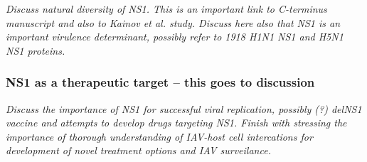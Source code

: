 		\textit{Discuss natural diversity of NS1. This is an important link to C-terminus manuscript and also to Kainov et al. study. Discuss here also that NS1 is an important virulence determinant, possibly refer to 1918 H1N1 NS1 and H5N1 NS1 proteins.}
		
		\subsubsection{NS1 as a therapeutic target -- this goes to discussion}
		
		\textit{Discuss the importance of NS1 for successful viral replication, possibly (?) delNS1 vaccine and attempts to develop drugs targeting NS1. Finish with stressing the importance of thorough understanding of IAV-host cell intercations for development of novel treatment options and IAV surveilance.}